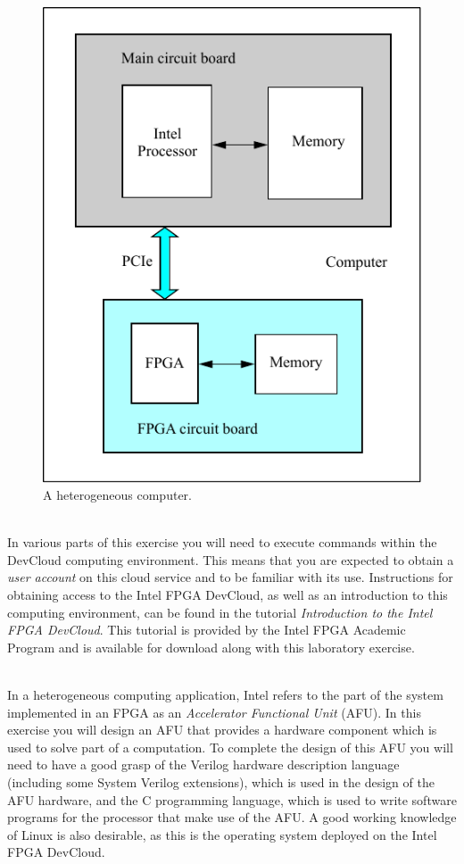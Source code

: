 \documentclass[epsfig,10pt,fullpage]{article}
\begin{document}
\begin{figure}[b!]
   \begin{center}
       \includegraphics[scale=1.0]{figures/heterogeneous.pdf}
   \end{center}
   \caption{A heterogeneous computer.}
	\label{fig:hetero}
\end{figure}

~\\
\noindent
In various parts of this exercise you will need to execute commands within the DevCloud 
computing environment. This means that you are expected to obtain a {\it user account} on this
cloud service and to be familiar with its use. Instructions for obtaining access to the Intel
FPGA DevCloud, as well as an introduction to this computing environment, can be found
in the tutorial {\it Introduction to the Intel FPGA DevCloud}. This tutorial 
is provided by the Intel FPGA Academic Program and is available for download along with 
this laboratory exercise. 

~\\
\noindent
In a heterogeneous computing application, Intel refers to the part of the system
implemented in an FPGA as an {\it Accelerator Functional Unit} (AFU). In this exercise you
will design an AFU that provides a hardware component which is used to solve part of a
computation.  To complete the design of this AFU you will need 
to have a good grasp of the Verilog hardware description language 
(including some System Verilog extensions), which is used in the design of the 
AFU hardware, and the C programming language, which is used to write software programs 
for the processor that make use of the AFU. A good working knowledge of Linux is also 
desirable, as this is the operating system deployed on the Intel FPGA DevCloud. 
\end{document}
